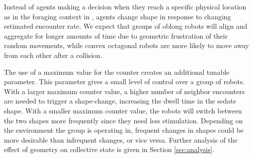 \documentclass[runningheads]{llncs}
\begin{document}
Instead of agents making a decision when they reach a specific physical location as in the foraging context in \cite{pavlic2021quorum}, agents change shape in response to changing estimated encounter rate. We expect that groups of oblong robots will align and aggregate for longer amounts of time due to geometric frustration of their random movements, while convex octagonal robots are more likely to move away from each other after a collision.


The use of a maximum value for the counter creates an additional tunable parameter. This parameter gives a small level of control over a group of robots. With a larger maximum counter value, a higher number of neighbor encounters are needed to trigger a shape-change, increasing the dwell time in the sedate shape. With a smaller maximum counter value, the robots will switch between the two shapes more frequently since they need less stimulation. Depending on the environment the group is operating in, frequent changes in shapes could be more desirable than infrequent changes, or vice versa. Further analysis of the effect of geometry on collective state is given in Section \ref{sec:analysis}.


\begin{algorithm}
\label{alg:one}
\caption{Pseudo-code of the control law operating on board each robot. The timer $T$ is assumed to be continuously incrementing.}
\end{algorithm}
\end{document}
